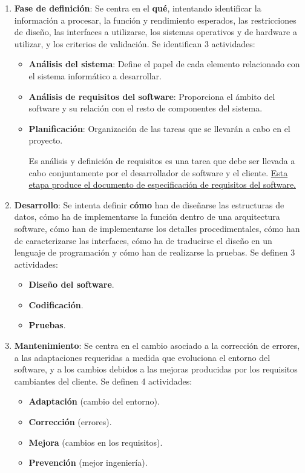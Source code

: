 \begin{enumerate}
    \item \textbf{Fase de definición}: Se centra en el \textbf{qué}, intentando identificar la información a procesar, la función y rendimiento esperados, las restricciones de diseño, las interfaces a utilizarse, los sistemas operativos y de hardware a utilizar, y los criterios de validación. Se identifican 3 actividades:
    \begin{itemize}
        \item \textbf{Análisis del sistema}: Define el papel de cada elemento relacionado con el sistema informático a desarrollar.
        \item \textbf{Análisis de requisitos del software}: Proporciona el ámbito del software y su relación con el resto de componentes del sistema.
        \item \textbf{Planificación}: Organización de las tareas que se llevarán a cabo en el proyecto.

        Es análisis y definición de requisitos es una tarea que debe ser llevada a cabo conjuntamente por el desarrollador de software y el cliente. \uline{Esta etapa produce el documento de especificación de requisitos del software.}
    \end{itemize}
    \item \textbf{Desarrollo}: Se intenta definir \textbf{cómo} han de diseñarse las estructuras de datos, cómo ha de implementarse la función dentro de una arquitectura software, cómo han de implementarse los detalles procedimentales, cómo han de caracterizarse las interfaces, cómo ha de traducirse el diseño en un lenguaje de programación y cómo han de realizarse la pruebas. Se definen 3 actividades: 
    \begin{itemize}
        \item \textbf{Diseño del software}.
        \item \textbf{Codificación}.
        \item \textbf{Pruebas}.
    \end{itemize}
    \item \textbf{Mantenimiento}: Se centra en el cambio asociado a la corrección de errores, a las adaptaciones requeridas a medida que evoluciona el entorno del software, y a los cambios debidos a las mejoras producidas por los requisitos cambiantes del cliente. Se definen 4 actividades:
    \begin{itemize}
        \item \textbf{Adaptación} (cambio del entorno).
        \item \textbf{Corrección} (errores).
        \item \textbf{Mejora} (cambios en los requisitos).
        \item \textbf{Prevención} (mejor ingeniería).
    \end{itemize}
\end{enumerate}

